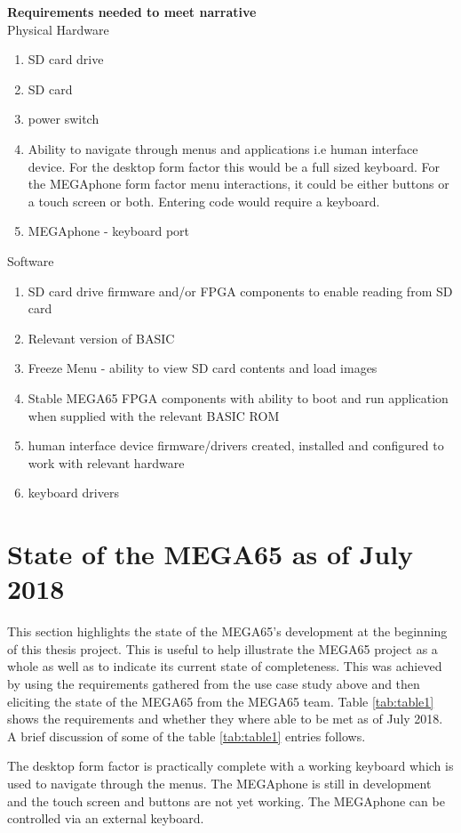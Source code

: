 \textbf{Requirements needed to meet narrative}\\
Physical Hardware
\begin{enumerate}
\item SD card drive
\item SD card
\item power switch
\item Ability to navigate through menus and applications i.e human interface device. For the desktop form factor this would be a full sized keyboard. For the MEGAphone form factor menu interactions, it could be either buttons or a touch screen or both. Entering code would require a keyboard.
\item MEGAphone - keyboard port
\end{enumerate}

Software\\
\begin{enumerate}
\item SD card drive firmware and/or FPGA components to enable reading from SD card
\item Relevant version of BASIC 
\item Freeze Menu - ability to view SD card contents and load images
\item Stable MEGA65 FPGA components with ability to boot and run application when supplied with the relevant BASIC ROM
\item human interface device firmware/drivers created, installed and configured to work with relevant hardware
\item keyboard drivers
\end{enumerate}

\section{State of the MEGA65 as of July 2018}
This section highlights the state of the MEGA65's development at the beginning of this thesis project. This is useful to help illustrate the MEGA65 project as a whole as well as to indicate its current state of completeness. This was achieved by using the requirements gathered from the use case study above and then eliciting the state of the MEGA65 from the MEGA65 team. Table \ref{tab:table1} shows the requirements and whether they where able to be met as of July 2018. A brief discussion of some of the table \ref{tab:table1} entries follows. 

The desktop form factor is practically complete with a working keyboard which is used to navigate through the menus. The MEGAphone is still in development and the touch screen and buttons are not yet working. The MEGAphone can be controlled via an external keyboard.

